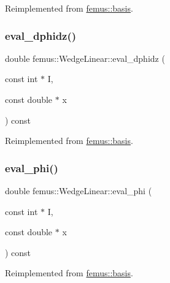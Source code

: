 Reimplemented from \mbox{\hyperlink{classfemus_1_1basis_a2819fac9aae797156b9efec8a0b85cc1}{femus\+::basis}}.

\mbox{\label{classfemus_1_1_wedge_linear_aedbe9536bad4b99ef918810e6d0d6689}} 
\subsubsection{\texorpdfstring{eval\+\_\+dphidz()}{eval\_dphidz()}}
{\footnotesize\ttfamily double femus\+::\+Wedge\+Linear\+::eval\+\_\+dphidz (\begin{DoxyParamCaption}\item[{const int $\ast$}]{I,  }\item[{const double $\ast$}]{x }\end{DoxyParamCaption}) const\hspace{0.3cm}{\ttfamily [virtual]}}



Reimplemented from \mbox{\hyperlink{classfemus_1_1basis_affd9927f6e25e264108219d862b8cb3d}{femus\+::basis}}.

\mbox{\label{classfemus_1_1_wedge_linear_a43a10867684e0d86006836afb3cd02ec}} 
\subsubsection{\texorpdfstring{eval\+\_\+phi()}{eval\_phi()}}
{\footnotesize\ttfamily double femus\+::\+Wedge\+Linear\+::eval\+\_\+phi (\begin{DoxyParamCaption}\item[{const int $\ast$}]{I,  }\item[{const double $\ast$}]{x }\end{DoxyParamCaption}) const\hspace{0.3cm}{\ttfamily [virtual]}}



Reimplemented from \mbox{\hyperlink{classfemus_1_1basis_a89b0797cdccffae5ff6d059b32016ae5}{femus\+::basis}}.

